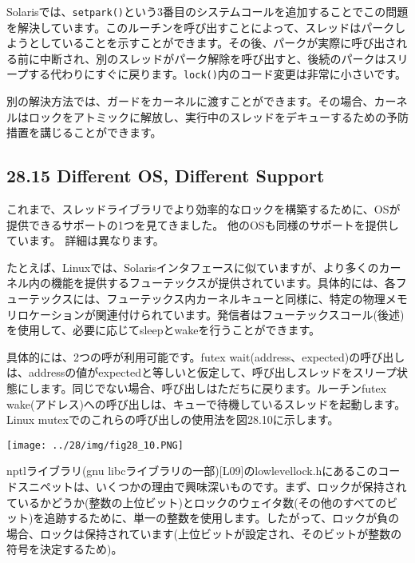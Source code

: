 Solarisでは、\texttt{setpark()}という3番目のシステムコールを追加することでこの問題を解決しています。このルーチンを呼び出すことによって、スレッドはパークしようとしていることを示すことができます。その後、パークが実際に呼び出される前に中断され、別のスレッドがパーク解除を呼び出すと、後続のパークはスリープする代わりにすぐに戻ります。\texttt{lock()}内のコード変更は非常に小さいです。

\begin{Shaded}
\begin{Highlighting}[]
\NormalTok{;}
\end{Highlighting}
\end{Shaded}

別の解決方法では、ガードをカーネルに渡すことができます。その場合、カーネルはロックをアトミックに解放し、実行中のスレッドをデキューするための予防措置を講じることができます。

\hypertarget{different-os-different-support}{%
\subsection*{28.15 Different OS, Different
Support}\label{different-os-different-support}}

これまで、スレッドライブラリでより効率的なロックを構築するために、OSが提供できるサポートの1つを見てきました。
他のOSも同様のサポートを提供しています。 詳細は異なります。

たとえば、Linuxでは、Solarisインタフェースに似ていますが、より多くのカーネル内の機能を提供するフューテックスが提供されています。具体的には、各フューテックスには、フューテックス内カーネルキューと同様に、特定の物理メモリロケーションが関連付けられています。発信者はフューテックスコール(後述)を使用して、必要に応じてsleepとwakeを行うことができます。

具体的には、2つの呼が利用可能です。futex
wait(address、expected)の呼び出しは、addressの値がexpectedと等しいと仮定して、呼び出しスレッドをスリープ状態にします。同じでない場合、呼び出しはただちに戻ります。ルーチンfutex
wake(アドレス)への呼び出しは、キューで待機しているスレッドを起動します。Linux
mutexでのこれらの呼び出しの使用法を図28.10に示します。

\texttt{[image: ../28/img/fig28\_10.PNG]}

nptlライブラリ(gnu
libcライブラリの一部){[}L09{]}のlowlevellock.hにあるこのコードスニペットは、いくつかの理由で興味深いものです。まず、ロックが保持されているかどうか(整数の上位ビット)とロックのウェイタ数(その他のすべてのビット)を追跡するために、単一の整数を使用します。したがって、ロックが負の場合、ロックは保持されています(上位ビットが設定され、そのビットが整数の符号を決定するため)。

